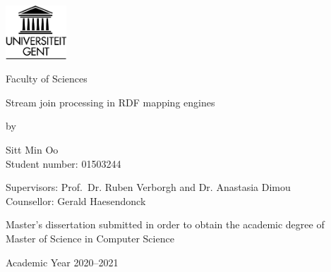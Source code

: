 

\begin{titlepage}

    \setlength{\hoffset}{-1in}
    \setlength{\voffset}{-1in}
    \setlength{\topmargin}{1.5cm}
    \setlength{\headheight}{0.5cm}
    \setlength{\headsep}{1cm}
    \setlength{\oddsidemargin}{3cm}
    \setlength{\evensidemargin}{3cm}
    \setlength{\footskip}{1.5cm}
    \enlargethispage{1cm}

    \fontsize{12pt}{14pt}
    \selectfont

    \begin{center}

    \includegraphics[height=2cm]{fig/ruglogo.png}

    \vspace{0.5cm}

    Faculty of Sciences\\

    \vspace{3.5cm}

    \fontsize{17.28pt}{21pt}
    \selectfont

Stream join processing in RDF mapping engines

    \fontsize{12pt}{14pt}
    \selectfont

    \vspace{.6cm}

    by

    \vspace{.4cm}

Sitt Min Oo\\
Student number: 01503244\\

    \vspace{3.5cm}

Supervisors: Prof.~Dr. Ruben Verborgh and Dr. Anastasia Dimou\\
Counsellor: Gerald Haesendonck\\

    \vspace{2cm}

    Master's dissertation submitted in order to obtain the academic degree of\\
    Master of Science in Computer Science

    \vspace{1cm}

Academic Year 2020--2021

    \end{center}
    \end{titlepage}
